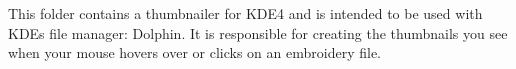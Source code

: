 This folder contains a thumbnailer for KDE4 and is intended to be used with KDE\textquotesingle{}s file manager\+: Dolphin. It is responsible for creating the thumbnails you see when your mouse hovers over or clicks on an embroidery file. 